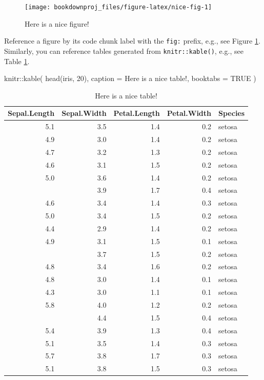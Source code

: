 \documentclass[
]{book}
\newenvironment{Shaded}{\begin{snugshade}}{\end{snugshade}}
\newcommand{\AttributeTok}[1]{\textcolor[rgb]{0.77,0.63,0.00}{#1}}
\newcommand{\ConstantTok}[1]{\textcolor[rgb]{0.00,0.00,0.00}{#1}}
\newcommand{\DecValTok}[1]{\textcolor[rgb]{0.00,0.00,0.81}{#1}}
\newcommand{\FunctionTok}[1]{\textcolor[rgb]{0.00,0.00,0.00}{#1}}
\newcommand{\NormalTok}[1]{#1}
\newcommand{\SpecialCharTok}[1]{\textcolor[rgb]{0.00,0.00,0.00}{#1}}
\newcommand{\StringTok}[1]{\textcolor[rgb]{0.31,0.60,0.02}{#1}}
\theoremstyle{definition}
\theoremstyle{definition}
\theoremstyle{definition}
\theoremstyle{definition}
\theoremstyle{remark}
\begin{document}
\begin{figure}

{\centering \texttt{[image: bookdownproj\_files/figure-latex/nice-fig-1]} 

}

\caption{Here is a nice figure!}\label{fig:nice-fig}
\end{figure}

Reference a figure by its code chunk label with the \texttt{fig:} prefix, e.g., see Figure \ref{fig:nice-fig}. Similarly, you can reference tables generated from \texttt{knitr::kable()}, e.g., see Table \ref{tab:nice-tab}.

\begin{Shaded}
\begin{Highlighting}[]
\NormalTok{knitr}\SpecialCharTok{::}\FunctionTok{kable}\NormalTok{(}
  \FunctionTok{head}\NormalTok{(iris, }\DecValTok{20}\NormalTok{), }\AttributeTok{caption =} \StringTok{\textquotesingle{}Here is a nice table!\textquotesingle{}}\NormalTok{,}
  \AttributeTok{booktabs =} \ConstantTok{TRUE}
\NormalTok{)}
\end{Highlighting}
\end{Shaded}

\begin{table}

\caption{\label{tab:nice-tab}Here is a nice table!}
\centering
\begin{tabular}[t]{rrrrl}
\toprule
Sepal.Length & Sepal.Width & Petal.Length & Petal.Width & Species\\
\midrule
5.1 & 3.5 & 1.4 & 0.2 & setosa\\
4.9 & 3.0 & 1.4 & 0.2 & setosa\\
4.7 & 3.2 & 1.3 & 0.2 & setosa\\
4.6 & 3.1 & 1.5 & 0.2 & setosa\\
5.0 & 3.6 & 1.4 & 0.2 & setosa\\
\addlinespace
5.4 & 3.9 & 1.7 & 0.4 & setosa\\
4.6 & 3.4 & 1.4 & 0.3 & setosa\\
5.0 & 3.4 & 1.5 & 0.2 & setosa\\
4.4 & 2.9 & 1.4 & 0.2 & setosa\\
4.9 & 3.1 & 1.5 & 0.1 & setosa\\
\addlinespace
5.4 & 3.7 & 1.5 & 0.2 & setosa\\
4.8 & 3.4 & 1.6 & 0.2 & setosa\\
4.8 & 3.0 & 1.4 & 0.1 & setosa\\
4.3 & 3.0 & 1.1 & 0.1 & setosa\\
5.8 & 4.0 & 1.2 & 0.2 & setosa\\
\addlinespace
5.7 & 4.4 & 1.5 & 0.4 & setosa\\
5.4 & 3.9 & 1.3 & 0.4 & setosa\\
5.1 & 3.5 & 1.4 & 0.3 & setosa\\
5.7 & 3.8 & 1.7 & 0.3 & setosa\\
5.1 & 3.8 & 1.5 & 0.3 & setosa\\
\bottomrule
\end{tabular}
\end{table}
\end{document}
